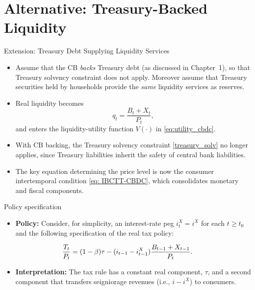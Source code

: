 \documentclass[11pt,aspectratio=169]{beamer}
\begin{document}
\section{Alternative: Treasury-Backed Liquidity}
\begin{frame}{Extension: Treasury Debt Supplying Liquidity Services}
\begin{itemize}
\item Assume that the CB \emph{backs} Treasury debt (as discussed in Chapter~1), so that Treasury solvency constraint does not apply. Moreover assume that Treasury securities held by households provide the \emph{same} liquidity  
services as reserves.
    
\item Real liquidity becomes
\[
   q_t = \frac{B_t + X_t}{P_t},
\]
and enters the liquidity-utility function $V(\cdot)$ in \eqref{eq:utility_cbdc}.

\vspace{0.7em}

\item With CB backing, the Treasury solvency constraint \eqref{treasury_solv} no longer applies,  
since Treasury liabilities inherit the safety of central bank liabilities.

\item The key equation determining the price level is now the consumer intertemporal condition  
\eqref{eq: IBCTT-CBDC}, which consolidates monetary and fiscal components.
\end{itemize}
\end{frame}

\begin{frame}{Policy specification}

\begin{itemize}
    \item \textbf{Policy:} Consider, for simplicity, an interest-rate peg $i_{t}^{X}=i^{X}$ for each $t\geq t_{0}$ and the following specification of the real tax policy:
\end{itemize}
\begin{equation}
\frac{T_{t}}{P_{t}}=(1-\beta )\tau -(i_{t-1}-i_{t-1}^{X})\frac{%
B_{t-1}+X_{t-1}}{P_{t}} \label{Tax-CBDC}.
\end{equation}
\vspace{1em}

\begin{itemize}
    \item \textbf{Interpretation:} The tax rule has a constant real component, $\tau$, and a second component that transfers seigniorage revenues (i.e., $i - i^X$) to consumers.
\end{itemize}
\end{frame}
\end{document}
